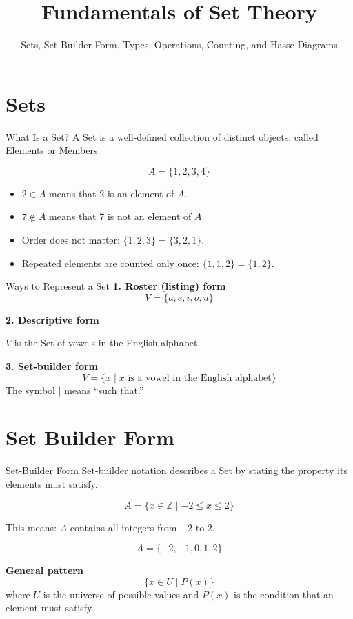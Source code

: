 \documentclass[aspectratio=169,11pt]{beamer}
\title{Fundamentals of Set Theory}
\subtitle{Sets, Set Builder Form, Types, Operations, Counting, and Hasse Diagrams}
\author{}
\date{}
\begin{document}
\begin{frame}
  \titlepage
\end{frame}

\section{Sets}

\begin{frame}{What Is a Set?}
A \alert{Set} is a well-defined collection of distinct objects, called
\alert{Elements} or \alert{Members}.

\[
 A=\{1,2,3,4\}
\]

\begin{itemize}
  \item \(2\in A\) means that 2 is an element of \(A\).
  \item \(7\notin A\) means that 7 is not an element of \(A\).
  \item Order does not matter: \(\{1,2,3\}=\{3,2,1\}\).
  \item Repeated elements are counted only once:
        \(\{1,1,2\}=\{1,2\}\).
\end{itemize}
\end{frame}

\begin{frame}{Ways to Represent a Set}
\textbf{1. Roster (listing) form}
\[
  V=\{a,e,i,o,u\}
\]

\textbf{2. Descriptive form}

\(V\) is the Set of vowels in the English alphabet.

\textbf{3. Set-builder form}
\[
  V=\{x\mid x\text{ is a vowel in the English alphabet}\}
\]
The symbol \(\mid\) means ``such that.''
\end{frame}

\section{Set Builder Form}

\begin{frame}{Set-Builder Form}
Set-builder notation describes a Set by stating the property its elements
must satisfy.

\[
  A=\{x\in\mathbb{Z}\mid -2\leq x\leq 2\}
\]

This means: \(A\) contains all integers from \(-2\) to \(2\).

\[
  A=\{-2,-1,0,1,2\}
\]

\textbf{General pattern}
\[
  \{x\in U\mid P(x)\}
\]
where \(U\) is the universe of possible values and \(P(x)\) is the condition
that an element must satisfy.
\end{frame}
\end{document}
